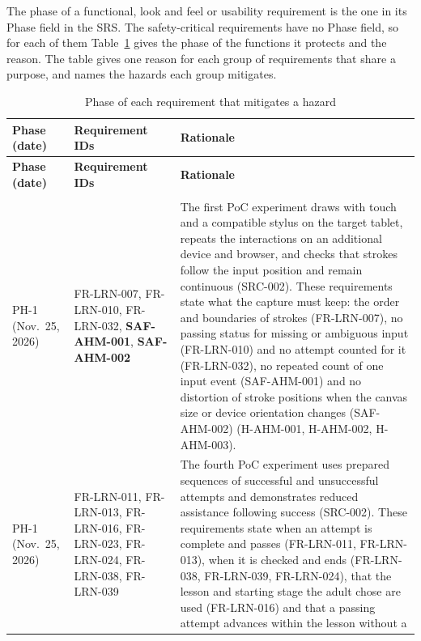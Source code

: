 \documentclass{article}
\begin{document}
The phase of a functional, look and feel or usability requirement is the one in
its Phase field in the SRS. The safety-critical requirements have no Phase
field, so for each of them Table~\ref{tab:roadmap} gives the phase of the
functions it protects and the reason. The table gives one reason for each group
of requirements that share a purpose, and names the hazards each group
mitigates.

{\footnotesize
\setlength{\tabcolsep}{4pt}
\begin{longtable}{@{}
  >{\raggedright\arraybackslash}p{1.7cm} >{\raggedright\arraybackslash}p{2.4cm}
  >{\raggedright\arraybackslash}p{\dimexpr\linewidth-4.1cm-4\tabcolsep\relax}
  @{}}
\caption{Phase of each requirement that mitigates a hazard}
\label{tab:roadmap}\\
\toprule
\textbf{Phase (date)} & \textbf{Requirement IDs} & \textbf{Rationale} \\
\midrule
\endfirsthead
\toprule
\textbf{Phase (date)} & \textbf{Requirement IDs} & \textbf{Rationale} \\
\midrule
\endhead
\midrule
\multicolumn{3}{@{}r@{}}{\emph{Continued on the next page}} \\
\endfoot
\bottomrule
\endlastfoot
PH-1 (Nov.~25, 2026) & FR-LRN-007, FR-LRN-010, FR-LRN-032, \textbf{SAF-AHM-001},
\textbf{SAF-AHM-002} & The
first PoC experiment draws with touch and a compatible stylus on the target
tablet, repeats the interactions on an additional device and browser, and checks
that strokes follow the input position and remain continuous (SRC-002). These
requirements state what the capture must keep: the order and boundaries of
strokes (FR-LRN-007), no passing status for missing or ambiguous input
(FR-LRN-010) and no attempt counted for it (FR-LRN-032), no repeated count of one input event (SAF-AHM-001) and no
distortion of stroke positions when the canvas size or device orientation
changes (SAF-AHM-002) (H-AHM-001, H-AHM-002, H-AHM-003). \\
\addlinespace
PH-1 (Nov.~25, 2026) & FR-LRN-011, FR-LRN-013, FR-LRN-016, FR-LRN-023,
FR-LRN-024, FR-LRN-038, FR-LRN-039 & The
fourth PoC experiment uses prepared sequences of successful and unsuccessful
attempts and demonstrates reduced assistance following success (SRC-002). These
requirements state when an attempt is complete and passes (FR-LRN-011,
FR-LRN-013), when it is checked and ends (FR-LRN-038, FR-LRN-039, FR-LRN-024),
that the lesson and starting stage the adult chose are used
(FR-LRN-016) and that a passing attempt advances within the lesson without a

\end{longtable}}
\end{document}
